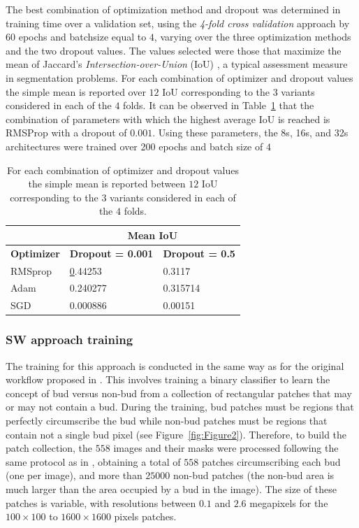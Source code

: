 \documentclass[a4paper,authoryear,review]{elsarticle}
\begin{document}
	The best combination of optimization method and dropout was determined in training time over a validation set, using the \emph{4-fold cross validation} approach by 60 epochs and batchsize equal to $4$, varying over the three optimization methods and the two dropout values. The values selected were those that maximize the mean of Jaccard's \emph{Intersection-over-Union} (IoU) \citep{jaccard1912distribution}, a typical assessment measure in segmentation problems. For each combination of optimizer and dropout values the simple mean is reported over $12$ IoU corresponding to the $3$ variants considered in each of the $4$ folds. It can be observed in Table~\ref{tab:Table2} that the combination of parameters with which the highest average IoU is reached is RMSProp with a dropout of $0.001$. Using these parameters, the 8s, 16s, and 32s architectures were trained over 200 epochs and batch size of $4$
	
	\begin{table}[]
		\centering
		\begin{tabular}{lll}
			\hline
			\multicolumn{1}{|l|}{} & \multicolumn{2}{c|}{\textbf{Mean IoU}} \\ \hline
			\multicolumn{1}{|c|}{\textbf{Optimizer}} & \multicolumn{1}{c|}{\textbf{Dropout = 0.001}} & \multicolumn{1}{c|}{\textbf{Dropout = 0.5}} \\ \hline
			RMSprop & {\ul 0.44253} & 0.3117 \\
			Adam & 0.240277 & 0.315714 \\
			SGD & 0.000886 & 0.00151 \\ \hline
		\end{tabular}%
		\caption{
			For each combination of optimizer and dropout values the simple mean is reported between $12$ IoU corresponding to the $3$ variants considered in each of the $4$ folds.
		}
		\label{tab:Table2}
	\end{table}
	
	
	\subsubsection{SW approach training}
	\label{sec:swtrain}
	
	The training for this approach is conducted in the same way as for the original workflow proposed in \citet{perez2017image}. This involves training a binary classifier to learn the concept of bud versus non-bud from a collection of rectangular patches that may or may not contain a bud. During the training, bud patches must be regions that perfectly circumscribe the bud while non-bud patches must be regions that contain not a single bud pixel (see Figure~\ref{fig:Figure2}). Therefore, to build the patch collection, the $558$ images and their masks were processed following the same protocol as in \citet{perez2017image}, obtaining a total of  $558$ patches circumscribing each bud (one per image), and more than $25000$ non-bud patches (the non-bud area is much larger than the area occupied by a bud in the image). The size of these patches is variable, with resolutions between $0.1$ and $2.6$ megapixels  for the  $100 \times 100$ to $1600 \times 1600$ pixels patches.
	
\end{document}
